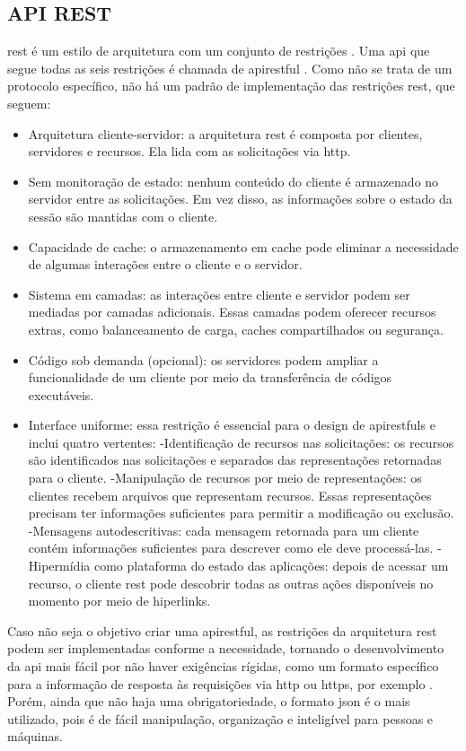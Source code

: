 \subsection{API REST}
\Gls{rest} é um estilo de arquitetura com um conjunto de restrições \cite{redhat_apirest}. Uma \ac{api} que segue todas as seis restrições é chamada de \gls{apirestful} \cite{royfielding}. Como não se trata de um protocolo específico, não há um padrão de implementação das restrições \ac{rest}, que seguem:
\begin{quoting}[rightmargin=0cm,leftmargin=4cm]
	\begin{SingleSpace}
		{\footnotesize 
			\begin{itemize}
				\item Arquitetura cliente-servidor: a arquitetura \ac{rest} é composta por clientes, servidores e recursos. Ela lida com as solicitações via \acs{http}.
				\item Sem monitoração de estado: nenhum conteúdo do cliente é armazenado no servidor entre as solicitações. Em vez disso, as informações sobre o estado da sessão são mantidas com o cliente.
				\item Capacidade de cache: o armazenamento em cache pode eliminar a necessidade de algumas interações entre o cliente e o servidor.
				\item Sistema em camadas: as interações entre cliente e servidor podem ser mediadas por camadas adicionais. Essas camadas podem oferecer recursos extras, como balanceamento de carga, caches compartilhados ou segurança.
				\item Código sob demanda (opcional): os servidores podem ampliar a funcionalidade de um cliente por meio da transferência de códigos executáveis.
				\item Interface uniforme: essa restrição é essencial para o design de \glspl{apirestful} e inclui quatro vertentes:
				\subitem -Identificação de recursos nas solicitações: os recursos são identificados nas solicitações e separados das representações retornadas para o cliente.
				\subitem -Manipulação de recursos por meio de representações: os clientes recebem arquivos que representam recursos. Essas representações precisam ter informações suficientes para permitir a modificação ou exclusão.
				\subitem -Mensagens autodescritivas: cada mensagem retornada para um cliente contém informações suficientes para descrever como ele deve processá-las.
				\subitem -Hipermídia como plataforma do estado das aplicações: depois de acessar um recurso, o cliente \ac{rest} pode descobrir todas as outras ações disponíveis no momento por meio de hiperlinks. \cite{redhat_api}
			\end{itemize}
			}
	\end{SingleSpace}
\end{quoting}
Caso não seja o objetivo criar uma \gls{apirestful}, as restrições da arquitetura \ac{rest} podem ser implementadas conforme a necessidade, tornando o desenvolvimento da \ac{api} mais fácil por não haver exigências rígidas, como um formato específico para a informação de resposta às requisições via \ac{http} ou \ac{https}, por exemplo \cite{redhat_apirest}. Porém, ainda que não haja uma obrigatoriedade, o formato \ac{json} é o mais utilizado, pois é de fácil manipulação, organização e inteligível para pessoas e máquinas.
